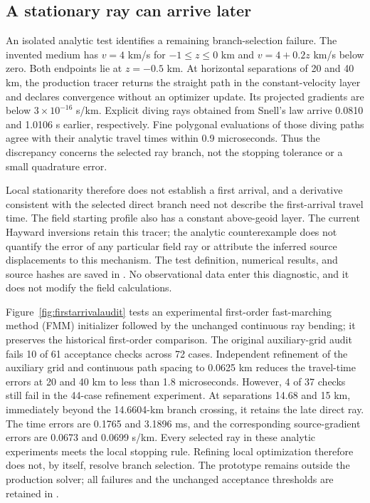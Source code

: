 \documentclass[11pt]{article}
\begin{document}
\subsection{A stationary ray can arrive later}\label{sec:firstarrival}
An isolated analytic test identifies a remaining branch-selection failure.
The invented medium has $v=4$ km/s for $-1\leq z\leq0$ km and
$v=4+0.2z$ km/s below zero. Both endpoints lie at $z=-0.5$ km.
At horizontal separations of 20 and 40 km, the production tracer returns
the straight path in the constant-velocity layer and declares convergence
without an optimizer update. Its projected gradients are below
$3\times10^{-16}$ s/km. Explicit diving rays obtained from Snell's law
arrive 0.0810 and 1.0106 s earlier, respectively. Fine polygonal evaluations
of those diving paths agree with their analytic travel times within
0.9 microseconds. Thus the discrepancy concerns the selected ray branch,
not the stopping tolerance or a small quadrature error.

Local stationarity therefore does not establish a first arrival, and a
derivative consistent with the selected direct branch need not describe the
first-arrival travel time. The field starting profile also has a constant
above-geoid layer. The current Hayward inversions retain this tracer;
the analytic counterexample does not quantify the error of any particular
field ray or attribute the inferred source displacements to this mechanism.
The test definition, numerical results, and source hashes are saved in
. No observational data enter
this diagnostic, and it does not modify the field calculations.

Figure~\ref{fig:firstarrivalaudit} tests an experimental first-order fast-marching
method (FMM) initializer followed by the unchanged continuous ray bending;
it preserves the historical first-order comparison.
The original auxiliary-grid audit fails 10 of 61 acceptance checks across
72 cases. Independent refinement of the auxiliary grid and continuous path
spacing to 0.0625 km reduces the travel-time errors at 20 and 40 km to less
than 1.8 microseconds. However, 4 of 37 checks still fail in the 44-case
refinement experiment. At separations 14.68 and 15 km, immediately beyond
the 14.6604-km branch crossing, it retains the late direct ray. The time
errors are 0.1765 and 3.1896 ms, and the corresponding source-gradient
errors are 0.0673 and 0.0699 s/km. Every selected ray in these analytic
experiments meets the local stopping rule. Refining local optimization
therefore does not, by itself, resolve branch selection. The prototype
remains outside the production solver; all failures and the unchanged
acceptance thresholds are retained in
.
\end{document}
